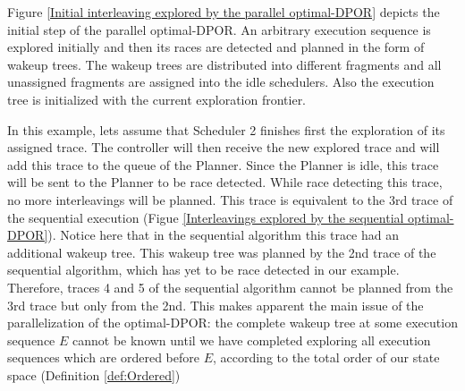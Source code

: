 Figure \ref{Initial interleaving explored by the parallel optimal-DPOR} depicts the initial step of the parallel optimal-DPOR. 
An arbitrary execution sequence is explored initially and then its races are detected and planned in the form of wakeup trees.
The wakeup trees are distributed into different fragments and all unassigned fragments are assigned into the idle schedulers.
Also the execution tree is initialized with the current exploration frontier.

In this example, lets assume that Scheduler 2 finishes first the exploration of its assigned trace. The controller will
then receive the new explored trace and will add this trace to the queue of the Planner. Since the Planner is idle,
this trace will be sent to the Planner to be race detected. While race detecting this trace, no more interleavings will be 
planned. This trace is equivalent to the 3rd trace of the sequential execution 
(Figue \ref{Interleavings explored by the sequential optimal-DPOR}). Notice here that in the sequential algorithm
this trace had an additional wakeup tree. This wakeup tree was planned by the 2nd trace of the sequential algorithm,
which has yet to be race detected in our example. Therefore, traces 4 and 5 of the sequential algorithm cannot be
planned from the 3rd trace but only from the 2nd. This makes apparent the main issue of the parallelization of the optimal-DPOR:
the complete wakeup tree at some execution sequence $E$ cannot be known until we have completed
exploring all execution sequences which are ordered before $E$, according to the total order of our state space
(Definition \ref{def:Ordered})